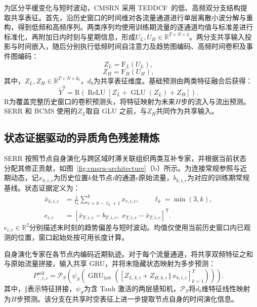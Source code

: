 为区分平缓变化与短时波动，CMSRN 采用 TEDDCF~\cite{ref18}的低、高频双分支结构提取共享表征。首先，沿历史窗口的时间维对各流量通道进行单层离散小波分解与重构，得到低频和高频序列。两类序列均使用训练期流量的逐通道均值与标准差进行标准化，再附加日内时刻与星期信息，形成\(U_L,U_H\in\mathbb{R}^{T\times N\times4}\)。两分支共享输入投影与时间嵌入，随后分别执行低频时间自注意力及趋势图编码、高频时间卷积及事件图编码：
\begin{equation}
\label{eq:low-frequency}
Z_L=\mathrm{F}_L(U_L),
\end{equation}
\begin{equation}
\label{eq:high-frequency}
Z_H=\mathrm{F}_H(U_H),
\end{equation}
其中，\(Z_L,Z_H\in\mathbb{R}^{T\times N\times d_b}\)，\(d_b\)为共享表征维度。基础预测由两类特征融合后获得：
\begin{equation}
\label{eq:base-prediction}
\widetilde{Y}^{0}=\mathrm{R}\!\left(\operatorname{ReLU}\!\left[Z_L+\operatorname{GLU}(Z_L)+Z_H\right]\right).
\end{equation}
\(\mathrm{R}\)为覆盖完整历史窗口的卷积预测头，将特征映射为未来\(H\)步的流入与流出预测。SERR 和 BCMS 使用的\(Z_L\)取自 GLU 之前，与\(Z_H\)共同作为共享输入。

\subsection{状态证据驱动的异质角色残差精炼}\label{sec:serr}

SERR 按照节点自身演化与跨区域时滞关联组织两类互补专家，并根据当前状态分配其修正贡献，如图~\ref{fig:cmsrn-architecture}（b）所示。为连接常规参照与近期动态，记\(x_{k,i,c}\)为历史位置\(k\)处节点\(i\)的通道\(c\)原始流量，\(b_{k,i,c}\)为对应的训练期常规基线。状态证据定义为：
\begin{equation}
\label{eq:state-evidence}
\begin{aligned}
\bar{x}_{k,i,c}&=\frac{1}{\ell_k}\sum_{r=k-\ell_k+1}^{k}x_{r,i,c},\qquad \ell_k=\min(3,k),\\
e_{i,c}&=\left[\bar{x}_{T,i,c}-b_{T,i,c},\;x_{T,i,c}-\bar{x}_{T,i,c}\right]^{\mathsf T}.
\end{aligned}
\end{equation}
\(e_{i,c}\in\mathbb{R}^{2}\)分别描述末时刻的趋势偏差与短时波动。均值仅使用当前历史窗口内已观测的位置，窗口起始处按可用长度计算。

自身演化专家在各节点内编码近期轨迹。对于每个流量通道，将共享双频特征之和与原始流量拼接，输入共享 GRU，并将末隐藏状态映射为多步预测：
\begin{equation}
\label{eq:self-expert}
P^{\mathrm{self}}_{:,i,c}
=\mathcal{P}_{S}\!\left(\psi_S\!\left(\operatorname{GRU}_{\mathrm{last}}
\left([Z_{L,k,i}+Z_{H,k,i}\,\Vert\,x_{k,i,c}]_{k=1}^{T}\right)\right)\right).
\end{equation}
其中，\(\Vert\)表示特征拼接，\(\psi_S\)为含 Tanh 激活的两层感知机，\(\mathcal{P}_S\)将\(d_b\)维特征线性映射为\(H\)步预测。该分支在共享时空表征上进一步提取节点自身的时间演化信息。

